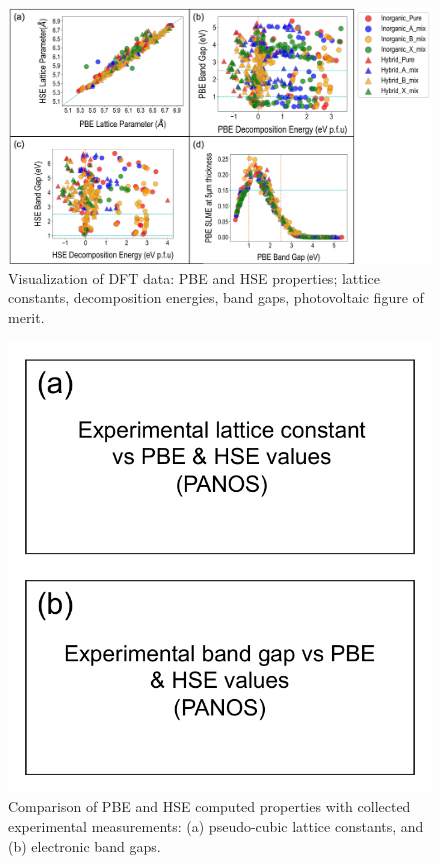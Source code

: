 \documentclass[twoside,twocolumn,9pt]{article}
\begin{document}
\begin{figure}[h]
\centering
\includegraphics[width=0.99\linewidth]{Figure2.png}
\caption{\label{Fig:outline} 
Visualization of DFT data: PBE and HSE properties; lattice constants, decomposition energies, band gaps, photovoltaic figure of merit.}
\end{figure}


\begin{figure}[h]
\centering
\includegraphics[width=0.80\linewidth]{Figure3.pdf}
\caption{\label{Fig:outline} 
Comparison of PBE and HSE computed properties with collected experimental measurements: (a) pseudo-cubic lattice constants, and (b) electronic band gaps.}
\end{figure}
\end{document}
